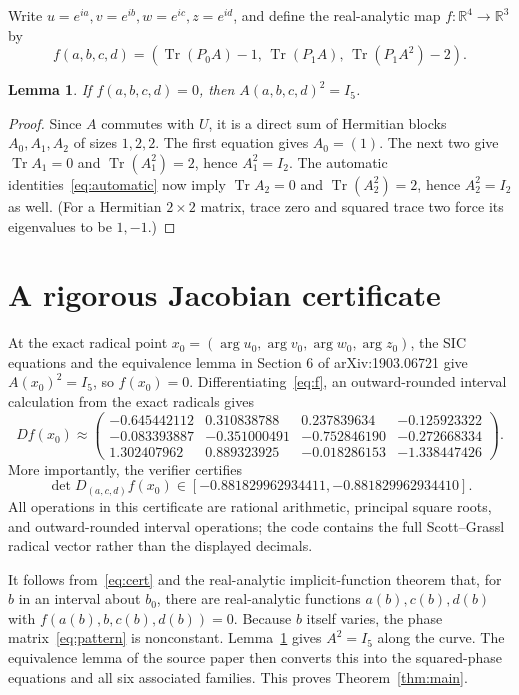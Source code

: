 \documentclass[11pt]{article}
\newtheorem{lemma}{Lemma}
\newcommand{\Tr}{\operatorname{Tr}}
\begin{document}
Write \(u=e^{ia},v=e^{ib},w=e^{ic},z=e^{id}\), and define the real-analytic map
\(f:\mathbb R^4\to\mathbb R^3\) by
\begin{equation}\label{eq:f}
 f(a,b,c,d)=
 \left(
 \Tr(P_0A)-1,\,
 \Tr(P_1A),\,
 \Tr(P_1A^2)-2
 \right).
\end{equation}

\begin{lemma}\label{lem:block}
If \(f(a,b,c,d)=0\), then \(A(a,b,c,d)^2=I_5\).
\end{lemma}

\begin{proof}
Since \(A\) commutes with \(U\), it is a direct sum of Hermitian blocks
\(A_0,A_1,A_2\) of sizes \(1,2,2\). The first equation gives \(A_0=(1)\).
The next two give \(\Tr A_1=0\) and \(\Tr(A_1^2)=2\), hence
\(A_1^2=I_2\). The automatic identities~\eqref{eq:automatic} now imply
\(\Tr A_2=0\) and \(\Tr(A_2^2)=2\), hence \(A_2^2=I_2\) as well. (For a
Hermitian \(2\times2\) matrix, trace zero and squared trace two force its
eigenvalues to be \(1,-1\).)
\end{proof}

\section*{A rigorous Jacobian certificate}

At the exact radical point
\(x_0=(\arg u_0,\arg v_0,\arg w_0,\arg z_0)\), the SIC equations and the
equivalence lemma in Section 6 of arXiv:1903.06721 give \(A(x_0)^2=I_5\), so
\(f(x_0)=0\). Differentiating~\eqref{eq:f}, an outward-rounded interval
calculation from the exact radicals gives
\[
 Df(x_0)\approx
 \begin{pmatrix}
 -0.645442112& 0.310838788& 0.237839634&-0.125923322\\
 -0.083393887&-0.351000491&-0.752846190&-0.272668334\\
  1.302407962& 0.889323925&-0.018286153&-1.338447426
 \end{pmatrix}.
\]
More importantly, the verifier certifies
\begin{equation}\label{eq:cert}
 \det D_{(a,c,d)}f(x_0)\in
 [-0.881829962934411,-0.881829962934410].
\end{equation}
All operations in this certificate are rational arithmetic, principal square
roots, and outward-rounded interval operations; the code contains the full
Scott--Grassl radical vector rather than the displayed decimals.

It follows from~\eqref{eq:cert} and the real-analytic implicit-function
theorem that, for \(b\) in an interval about \(b_0\), there are real-analytic
functions \(a(b),c(b),d(b)\) with
\(f(a(b),b,c(b),d(b))=0\). Because \(b\) itself varies, the phase
matrix~\eqref{eq:pattern} is nonconstant. Lemma~\ref{lem:block} gives
\(A^2=I_5\) along the curve. The equivalence lemma of the source paper then
converts this into the squared-phase equations and all six associated
families. This proves Theorem~\ref{thm:main}.
\end{document}
